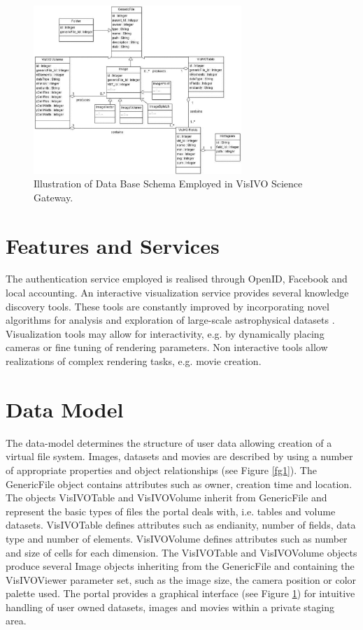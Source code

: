 \begin{figure}
\begin{center}
\includegraphics[width=0.7\textwidth]{part5/Costa_O08/O08_f2.eps}
\caption{Illustration of Data Base Schema Employed in VisIVO Science Gateway.}
\label{fg2}
\end{center}
\end{figure}

\section{Features and Services}
The authentication service employed is realised through OpenID, Facebook and local accounting. An interactive visualization service provides several knowledge discovery tools. These tools are constantly improved by incorporating novel algorithms for analysis and exploration of large-scale astrophysical datasets \citep{hassan2011scientific}. Visualization tools may allow for interactivity, e.g. by dynamically placing cameras or fine tuning of rendering parameters. Non interactive tools allow realizations of complex rendering tasks, e.g. movie creation.   

\section{Data Model}
The data-model determines the structure of user data allowing creation of a virtual file system. Images, datasets and movies are described by using a number of appropriate properties  and object relationships (see Figure \ref{fg1}). The GenericFile object contains attributes such as owner, creation time and location. The objects VisIVOTable and VisIVOVolume inherit from GenericFile and represent the basic types of files the portal deals with, i.e. tables and volume datasets. VisIVOTable defines attributes such as endianity, number of fields, data type and number of elements. VisIVOVolume defines attributes such as number and size of cells for each dimension. The VisIVOTable and VisIVOVolume objects produce several Image objects inheriting from the GenericFile and containing the VisIVOViewer parameter set, such as the image size, the camera position or color palette used. The portal provides a graphical interface (see Figure \ref{fg2}) for intuitive handling of user owned datasets, images and movies within a private staging area.

